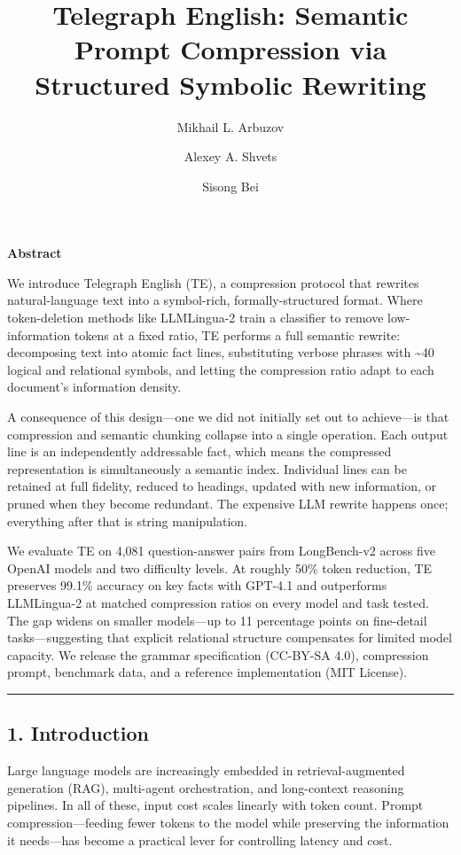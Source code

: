 \documentclass[
]{article}
\title{Telegraph English: Semantic Prompt Compression via Structured
Symbolic Rewriting}
\author{Mikhail L. Arbuzov \and Alexey A. Shvets \and Sisong Bei}
\date{}
\begin{document}
\maketitle

\textbf{Abstract}

We introduce Telegraph English (TE), a compression protocol that
rewrites natural-language text into a symbol-rich, formally-structured
format. Where token-deletion methods like LLMLingua-2 train a classifier
to remove low-information tokens at a fixed ratio, TE performs a full
semantic rewrite: decomposing text into atomic fact lines, substituting
verbose phrases with \textasciitilde40 logical and relational symbols,
and letting the compression ratio adapt to each document's information
density.

A consequence of this design---one we did not initially set out to
achieve---is that compression and semantic chunking collapse into a
single operation. Each output line is an independently addressable fact,
which means the compressed representation is simultaneously a semantic
index. Individual lines can be retained at full fidelity, reduced to
headings, updated with new information, or pruned when they become
redundant. The expensive LLM rewrite happens once; everything after that
is string manipulation.

We evaluate TE on 4,081 question-answer pairs from LongBench-v2 across
five OpenAI models and two difficulty levels. At roughly 50\% token
reduction, TE preserves 99.1\% accuracy on key facts with GPT-4.1 and
outperforms LLMLingua-2 at matched compression ratios on every model and
task tested. The gap widens on smaller models---up to 11 percentage
points on fine-detail tasks---suggesting that explicit relational
structure compensates for limited model capacity. We release the grammar
specification (CC-BY-SA 4.0), compression prompt, benchmark data, and a
reference implementation (MIT License).

\begin{center}\rule{0.5\linewidth}{0.5pt}\end{center}

\subsection{1. Introduction}\label{introduction}

Large language models are increasingly embedded in retrieval-augmented
generation (RAG), multi-agent orchestration, and long-context reasoning
pipelines. In all of these, input cost scales linearly with token count.
Prompt compression---feeding fewer tokens to the model while preserving
the information it needs---has become a practical lever for controlling
latency and cost.
\end{document}
